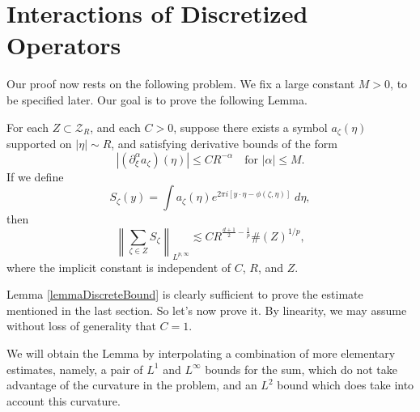 \section{Interactions of Discretized Operators}

Our proof now rests on the following problem. We fix a large constant $M > 0$, to be specified later. Our goal is to prove the following Lemma.

\begin{lemma} \label{lemmaDiscreteBound}
    For each $Z \subset \mathcal{Z}_R$, and each $C > 0$, suppose there exists a symbol $a_\zeta(\eta)$ supported on $|\eta| \sim R$, and satisfying derivative bounds of the form
    \[ |(\partial_\xi^\alpha a_\zeta)(\eta)| \leq C R^{-\alpha} \quad\text{for $|\alpha| \leq M$}. \]
    If we define
    \[ S_\zeta(y) = \int a_\zeta(\eta) e^{2 \pi i [y \cdot \eta - \phi(\zeta, \eta)]}\; d\eta, \]
    then
    \[ \left\| \sum_{\zeta \in Z} S_\zeta \right\|_{L^{p,\infty}} \lesssim C R^{ \frac{d+1}{2} - \frac{1}{p} } \#(Z)^{1/p}, \]
    where the implicit constant is independent of $C$, $R$, and $Z$.
\end{lemma}

Lemma \ref{lemmaDiscreteBound} is clearly sufficient to prove the estimate mentioned in the last section. So let's now prove it. By linearity, we may assume without loss of generality that $C = 1$.

We will obtain the Lemma by interpolating a combination of more elementary estimates, namely, a pair of $L^1$ and $L^\infty$ bounds for the sum, which do not take advantage of the curvature in the problem, and an $L^2$ bound which does take into account this curvature.

%
%
%
%
%
%

